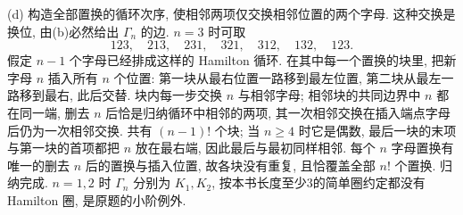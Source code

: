 \begin{solution}
(d) 构造全部置换的循环次序, 使相邻两项仅交换相邻位置的两个字母.
这种交换是换位, 由(b)必然给出 $\Gamma_n$ 的边.
$n=3$ 时可取
\[
123,\quad213,\quad231,\quad321,\quad312,\quad132,\quad123.
\]
假定 $n-1$ 个字母已经排成这样的 Hamilton 循环.
在其中每一个置换的块里, 把新字母 $n$ 插入所有 $n$ 个位置:
第一块从最右位置一路移到最左位置, 第二块从最左一路移到最右,
此后交替. 块内每一步交换 $n$ 与相邻字母;
相邻块的共同边界中 $n$ 都在同一端, 删去 $n$ 后恰是归纳循环中相邻的两项,
其一次相邻交换在插入端点字母后仍为一次相邻交换.
共有 $(n-1)!$ 个块; 当 $n\ge4$ 时它是偶数,
最后一块的末项与第一块的首项都把 $n$ 放在最右端,
因此最后与最初同样相邻.
每个 $n$ 字母置换有唯一的删去 $n$ 后的置换与插入位置,
故各块没有重复, 且恰覆盖全部 $n!$ 个置换. 归纳完成.
$n=1,2$ 时 $\Gamma_n$ 分别为 $K_1,K_2$,
按本书长度至少3的简单圈约定都没有 Hamilton 圈, 是原题的小阶例外.
\end{solution}

